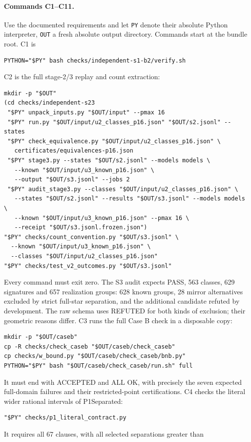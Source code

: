 \documentclass[11pt]{article}
\theoremstyle{definition}
\theoremstyle{remark}
\begin{document}
\paragraph{Commands C1--C11.}
Use the documented requirements and let \texttt{PY} denote their absolute
Python interpreter, \texttt{OUT} a fresh absolute output directory.
Commands start at the bundle root. C1 is
\begin{verbatim}
PYTHON="$PY" bash checks/independent-s1-b2/verify.sh
\end{verbatim}
C2 is the full stage-2/3 replay and count extraction:
\begin{verbatim}
mkdir -p "$OUT"
(cd checks/independent-s23
 "$PY" unpack_inputs.py "$OUT/input" --pmax 16
 "$PY" run.py "$OUT/input/u2_classes_p16.json" "$OUT/s2.jsonl" --states
 "$PY" check_equivalence.py "$OUT/input/u2_classes_p16.json" \
   certificates/equivalences-p16.json
 "$PY" stage3.py --states "$OUT/s2.jsonl" --models models \
   --known "$OUT/input/u3_known_p16.json" \
   --output "$OUT/s3.jsonl" --jobs 2
 "$PY" audit_stage3.py --classes "$OUT/input/u2_classes_p16.json" \
   --states "$OUT/s2.jsonl" --results "$OUT/s3.jsonl" --models models \
   --known "$OUT/input/u3_known_p16.json" --pmax 16 \
   --receipt "$OUT/s3.jsonl.frozen.json")
"$PY" checks/count_convention.py "$OUT/s3.jsonl" \
  --known "$OUT/input/u3_known_p16.json" \
  --classes "$OUT/input/u2_classes_p16.json"
"$PY" checks/test_v2_outcomes.py "$OUT/s3.jsonl"
\end{verbatim}
Every command must exit zero. The S3 audit expects PASS, 563 classes,
629 signatures and 657 realization groups: 628 known groups, 28 mirror
alternatives excluded by strict full-star separation, and the additional
candidate refuted by development. The raw schema uses REFUTED for both
kinds of exclusion; their geometric reasons differ.
C3 runs the full Case B check in a disposable copy:
\begin{verbatim}
mkdir -p "$OUT/caseb"
cp -R checks/check_caseb "$OUT/caseb/check_caseb"
cp checks/w_bound.py "$OUT/caseb/check_caseb/bnb.py"
PYTHON="$PY" bash "$OUT/caseb/check_caseb/run.sh" full
\end{verbatim}
It must end with ACCEPTED and ALL OK, with precisely the seven expected
full-domain failures and their restricted-point certifications.
C4 checks the literal wider rational intervals of P1Separated:
\begin{verbatim}
"$PY" checks/p1_literal_contract.py
\end{verbatim}
It requires all 67 clauses, with all selected separations greater than
\end{document}
